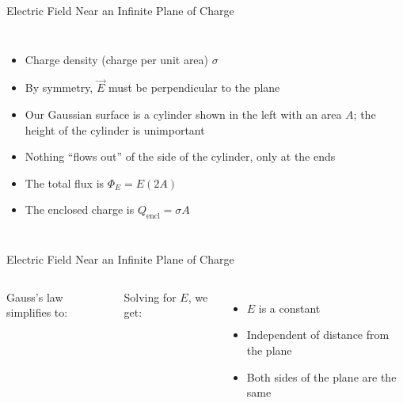 \documentclass[12pt,aspectratio=169]{beamer}
\begin{document}
\begin{frame}{Electric Field Near an Infinite Plane of Charge}
  \begin{columns}

    \begin{itemize}
    \item Charge density (charge per unit area) $\sigma$
    \item By symmetry, $\vec E$ must be perpendicular to the plane
    \item Our Gaussian surface is a cylinder shown in the left with an area
      $A$; the height of the cylinder is unimportant
    \item Nothing ``flows out'' of the side of the cylinder, only at the ends
    \item The total flux is $\Phi_E=E(2A)$
    \item The enclosed charge is $Q_\text{encl}=\sigma A$
    \end{itemize}
  \end{columns}
\end{frame}



\begin{frame}{Electric Field Near an Infinite Plane of Charge}
  \begin{columns}

    Gauss's law simplifies to:
    

    Solving for $E$, we get:

    \begin{itemize}
    \item $E$ is a constant
    \item Independent of distance from the plane
    \item Both sides of the plane are the same
    \end{itemize}
  \end{columns}
\end{frame}
\end{document}
